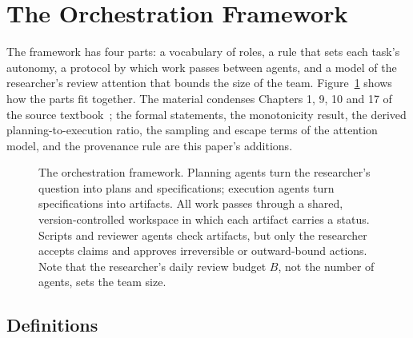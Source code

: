\section{The Orchestration Framework}
\label{sec:framework}

The framework has four parts: a vocabulary of roles, a rule that sets each task's
autonomy, a protocol by which work passes between agents, and a model of the researcher's
review attention that bounds the size of the team. Figure~\ref{fig:overview} shows how
the parts fit together. The material condenses Chapters 1, 9, 10 and 17 of the source
textbook~\cite{mccreary2026aiforee}; the formal statements, the monotonicity result, the
derived planning-to-execution ratio, the sampling and escape terms of the attention model,
and the provenance rule are this paper's additions.

\begin{figure}[htbp]
  \centering
  
  \caption{The orchestration framework. Planning agents turn the researcher's question
  into plans and specifications; execution agents turn specifications into artifacts.
  All work passes through a shared, version-controlled workspace in which each artifact
  carries a status. Scripts and reviewer agents check artifacts, but only the researcher
  accepts claims and approves irreversible or outward-bound actions. Note that the
  researcher's daily review budget $B$, not the number of agents, sets the team size.}
  \label{fig:overview}
\end{figure}

\subsection{Definitions}
\label{sec:definitions}

